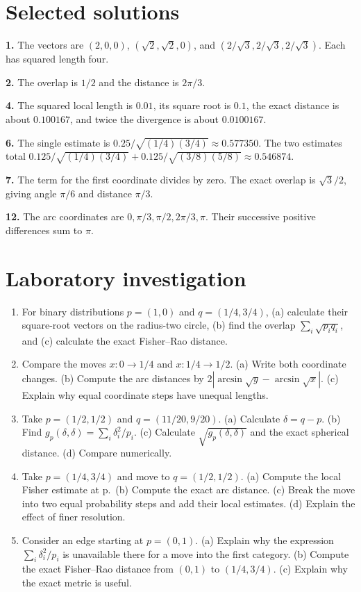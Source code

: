\documentclass[11pt,oneside,openany]{book}
\theoremstyle{definition}
\theoremstyle{remark}
\numberwithin{equation}{chapter}
\providecommand{\tightlist}{\setlength{\itemsep}{0pt}\setlength{\parskip}{0pt}}
\newcommand{\labheading}{\FloatBarrier\section*{Laboratory investigation}\addcontentsline{toc}{section}{Laboratory investigation}}
\begin{document}
\section{Selected solutions}\label{ch07-selected-solutions}

\textbf{1.} The vectors are \((2,0,0)\), \((\sqrt2,\sqrt2,0)\), and \((2/\sqrt3,2/\sqrt3,2/\sqrt3)\). Each has squared length four.

\textbf{2.} The overlap is \(1/2\) and the distance is \(2\pi/3\).

\textbf{4.} The squared local length is \(0.01\), its square root is \(0.1\), the exact distance is about \(0.100167\), and twice the divergence is about \(0.0100167\).

\textbf{6.} The single estimate is \(0.25/\sqrt{(1/4)(3/4)}\approx0.577350\). The two estimates total \(0.125/\sqrt{(1/4)(3/4)}+0.125/\sqrt{(3/8)(5/8)}\approx0.546874\).

\textbf{7.} The term for the first coordinate divides by zero. The exact overlap is \(\sqrt3/2\), giving angle \(\pi/6\) and distance \(\pi/3\).

\textbf{12.} The arc coordinates are \(0,\pi/3,\pi/2,2\pi/3,\pi\). Their successive positive differences sum to \(\pi\).
\labheading\begin{enumerate}
\def\labelenumi{\arabic{enumi}.}
\tightlist
\item
  For binary distributions \(p=(1,0)\) and \(q=(1/4,3/4)\), (a) calculate their square-root vectors on the radius-two circle, (b) find the overlap \(\sum_i\sqrt{p_iq_i}\), and (c) calculate the exact Fisher--Rao distance.
\item
  Compare the moves \(x:0\to1/4\) and \(x:1/4\to1/2\). (a) Write both coordinate changes. (b) Compute the arc distances by \(2|\arcsin\sqrt y-\arcsin\sqrt x|\). (c) Explain why equal coordinate steps have unequal lengths.
\item
  Take \(p=(1/2,1/2)\) and \(q=(11/20,9/20)\). (a) Calculate \(\delta=q-p\). (b) Find \(g_p(\delta,\delta)=\sum_i\delta_i^2/p_i\). (c) Calculate \(\sqrt{g_p(\delta,\delta)}\) and the exact spherical distance. (d) Compare numerically.
\item
  Take \(p=(1/4,3/4)\) and move to \(q=(1/2,1/2)\). (a) Compute the local Fisher estimate at p.~(b) Compute the exact arc distance. (c) Break the move into two equal probability steps and add their local estimates. (d) Explain the effect of finer resolution.
\item
  Consider an edge starting at \(p=(0,1)\). (a) Explain why the expression \(\sum_i\delta_i^2/p_i\) is unavailable there for a move into the first category. (b) Compute the exact Fisher--Rao distance from \((0,1)\) to \((1/4,3/4)\). (c) Explain why the exact metric is useful.
\end{enumerate}

\FloatBarrier
\end{document}

